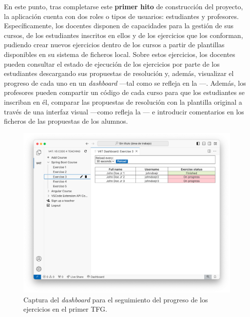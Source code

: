 En este punto, tras completarse este \textbf{primer hito} de construcción del proyecto, la aplicación cuenta con dos roles o tipos de usuarios: estudiantes y profesores. Específicamente, los docentes disponen de capacidades para la gestión de sus cursos, de los estudiantes inscritos en ellos y de los ejercicios que los conforman, pudiendo crear nuevos ejercicios dentro de los cursos a partir de plantillas disponibles en su sistema de ficheros local. Sobre estos ejercicios, los docentes pueden consultar el estado de ejecución de los ejercicios por parte de los estudiantes descargando sus propuestas de resolución y, además, visualizar el progreso de cada uno en un \textit{dashboard} ---tal como se refleja en la ---. Además, los profesores pueden compartir un código de cada curso para que los estudiantes se inscriban en él, comparar las propuestas de resolución con la plantilla original a través de una interfaz visual ---como refleja la --- e introducir comentarios en los ficheros de las propuestas de los alumnos.

\begin{figure}[h!]
    \centering
    \includegraphics[width=0.825\linewidth]{imagenes/utilizadas/1-introduccion/historia-tfg1-dashboard.png}
    \caption{Captura del \textit{dashboard} para el seguimiento del progreso de los ejercicios en el primer TFG.}
    \label{fig:historiaProyecto1Dashboard}
\end{figure}


